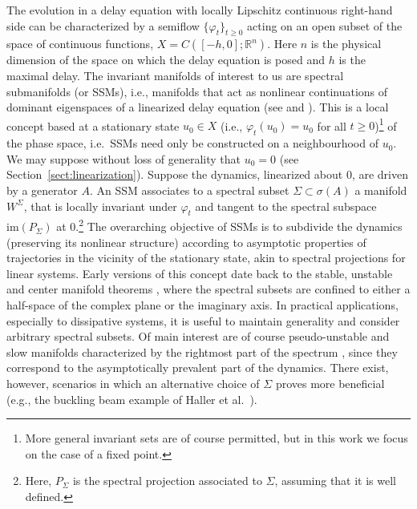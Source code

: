 \documentclass[a4paper, 12pt, oneside, reqno, notitlepage]{amsart}
\theoremstyle{plain}
\theoremstyle{definition}
\theoremstyle{remark}
\newcommand{\im}{\mathrm{im}}
\begin{document}
The evolution in a delay equation with locally Lipschitz continuous right-hand side can be characterized by a  semiflow $\{\varphi_t\}_{t \geq 0}$ acting on an open subset of the space of continuous functions, $X =C([-h,0];\mathbb{R}^n)$.
Here $n$ is the physical dimension of the space on which the delay equation is posed and $h$ is the maximal delay.
The invariant manifolds of interest to us are  spectral submanifolds (or SSMs), i.e., manifolds that act as nonlinear continuations of dominant eigenspaces of a linearized delay equation (see \cite{haller2016nonlinear} and \cite{haller2025modeling}). 
This is a local concept based at a stationary state $u_0 \in X$ (i.e., $\varphi_t(u_0) = u_0 $ for all $t \geq 0$)\footnote{More general invariant sets are of course permitted, but in this work we focus on the case of a fixed point.} of the phase space, i.e.\ SSMs need only be constructed on a neighbourhood of $u_0$.
We may suppose without loss of generality that $u_0=0$ (see Section~\ref{sect:linearization}).
Suppose the dynamics, linearized about $0$, are driven by a generator $A$. 
An SSM associates to a spectral subset $\Sigma \subset \sigma(A)$ a manifold $W^\Sigma$, that is locally invariant under $\varphi_t$ and tangent to the spectral subspace $\im (P_\Sigma)$ at $0$.\footnote{Here, $P_\Sigma$ is the spectral projection associated to $\Sigma$, assuming that it is well defined.}
The overarching objective of SSMs is to subdivide the dynamics (preserving its nonlinear structure) according to asymptotic properties of trajectories in the vicinity of the stationary state, akin to spectral projections for linear systems. 
Early versions of this concept date back to the stable, unstable and center manifold theorems
\cite{liapounoff1907probleme,hirsch1970stable,kelley1966stable}, 
where the spectral subsets are confined to either a half-space  of the complex plane or the imaginary axis.
In practical applications, especially to dissipative systems, it is useful to maintain generality and consider arbitrary spectral subsets.
Of main interest are of course pseudo-unstable and slow manifolds characterized by the rightmost part of the spectrum \cite{irwin1980new,chen1997invariant}, 
since they correspond 
to the asymptotically prevalent part of the dynamics.
There exist, however, scenarios in which an alternative choice of $\Sigma$ proves more beneficial (e.g., the buckling beam example of Haller et al.~\cite{haller2023nonlinear}). 
\end{document}

